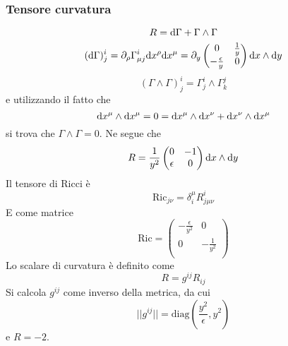 \subsubsection*{Tensore curvatura}
\[ R = \mathrm{d}\Gamma + \Gamma\wedge\Gamma \]
\begin{equation}
	(\mathrm{d}\Gamma)^i_j = \partial_\rho \Gamma_{\mu j}^i \mathrm{d} x^\rho \mathrm{d} x^\mu = \partial_y 
		\begin{pmatrix}
			0 & \frac{1}{y} \\
			-\frac{\epsilon}{y} & 0 \\
		\end{pmatrix}
		\mathrm{d} x\wedge\mathrm{d} y
\end{equation}
\[ (\Gamma\wedge\Gamma)^i_j = \Gamma^i_j\wedge\Gamma^j_k \]
e utilizzando il fatto che 
\[ \mathrm{d} x^\mu\wedge\mathrm{d} x^\mu = 0 = \mathrm{d} x^\mu\wedge\mathrm{d} x^\nu + \mathrm{d} x^\nu\wedge\mathrm{d} x^\mu \]
si trova che \( \Gamma\wedge\Gamma = 0 \).
Ne segue che 
\[ R = \frac{1}{y^2} 
	\begin{pmatrix}
		0 & -1 \\
		\epsilon & 0 \\
	\end{pmatrix}
	\mathrm{d} x\wedge\mathrm{d} y
\]
Il tensore di Ricci \`e 
\[ \mathrm{Ric}_{j\nu} = \delta^\mu_i R^i_{j\mu\nu} \]
E come matrice
\[ \mathrm{Ric} = 
	\begin{pmatrix}
		-\frac{\epsilon}{y^2} & 0 \\
		0                     & -\frac{1}{y^2} \\
	\end{pmatrix}
\]
Lo scalare di curvatura \`e definito come 
\[ R = g^{ij} R_{ij} \]
Si calcola $g^{ij}$ come inverso della metrica, da cui
\[ ||g^{ij}|| = \mathrm{diag}(\frac{y^2}{\epsilon}, y^2) \]
e $R=-2$.

